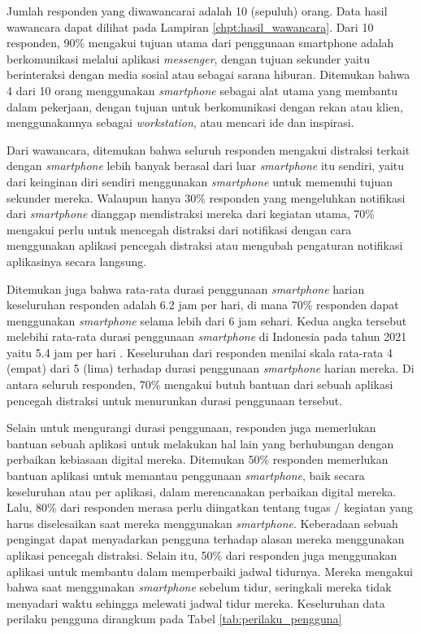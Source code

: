 \FloatBarrier

Jumlah responden yang diwawancarai adalah 10 (sepuluh) orang. Data hasil wawancara dapat dilihat pada Lampiran \ref{chpt:hasil_wawancara}. Dari 10 responden, 90\% mengakui tujuan utama dari penggunaan smartphone adalah berkomunikasi melalui aplikasi \textit{messenger}, dengan tujuan sekunder yaitu berinteraksi dengan media sosial atau sebagai sarana hiburan. Ditemukan bahwa 4 dari 10 orang menggunakan \textit{smartphone} sebagai alat utama yang membantu dalam pekerjaan, dengan tujuan untuk berkomunikasi dengan rekan atau klien, menggunakannya sebagai \textit{workstation}, atau mencari ide dan inspirasi.

Dari wawancara, ditemukan bahwa seluruh responden mengakui distraksi terkait dengan \textit{smartphone} lebih banyak berasal dari luar \textit{smartphone} itu sendiri, yaitu dari keinginan diri sendiri menggunakan \textit{smartphone} untuk memenuhi tujuan sekunder mereka. Walaupun hanya 30\% responden yang mengeluhkan notifikasi dari \textit{smartphone} dianggap mendistraksi mereka dari kegiatan utama, 70\% mengakui perlu untuk mencegah distraksi dari notifikasi dengan cara menggunakan aplikasi pencegah distraksi atau mengubah pengaturan notifikasi aplikasinya secara langsung.

Ditemukan juga bahwa rata-rata durasi penggunaan \textit{smartphone} harian keseluruhan responden adalah 6.2 jam per hari, di mana 70\% responden dapat menggunakan \textit{smartphone} selama lebih dari 6 jam sehari. Kedua angka tersebut melebihi rata-rata durasi penggunaan \textit{smartphone} di Indonesia pada tahun 2021 yaitu 5.4 jam per hari \parencite{dataai2022smartphoneindonesia}.  Keseluruhan dari responden menilai skala rata-rata 4 (empat) dari 5 (lima) terhadap durasi penggunaan \textit{smartphone} harian mereka. Di antara seluruh responden, 70\% mengakui butuh bantuan dari sebuah aplikasi pencegah distraksi untuk menurunkan durasi penggunaan tersebut.

Selain untuk mengurangi durasi penggunaan, responden juga memerlukan bantuan sebuah aplikasi untuk melakukan hal lain yang berhubungan dengan perbaikan kebiasaan digital mereka. Ditemukan 50\% responden memerlukan bantuan aplikasi untuk memantau penggunaan \textit{smartphone}, baik secara keseluruhan atau per aplikasi, dalam merencanakan perbaikan digital mereka. Lalu, 80\% dari responden merasa perlu diingatkan tentang tugas / kegiatan yang harus diselesaikan saat mereka menggunakan \textit{smartphone}. Keberadaan sebuah pengingat dapat menyadarkan pengguna terhadap alasan mereka menggunakan aplikasi pencegah distraksi. Selain itu, 50\% dari responden juga menggunakan aplikasi untuk membantu dalam memperbaiki jadwal tidurnya. Mereka mengakui bahwa saat menggunakan \textit{smartphone} sebelum tidur, seringkali mereka tidak menyadari waktu sehingga melewati jadwal tidur mereka. Keseluruhan data perilaku pengguna dirangkum pada Tabel \ref{tab:perilaku_pengguna}


